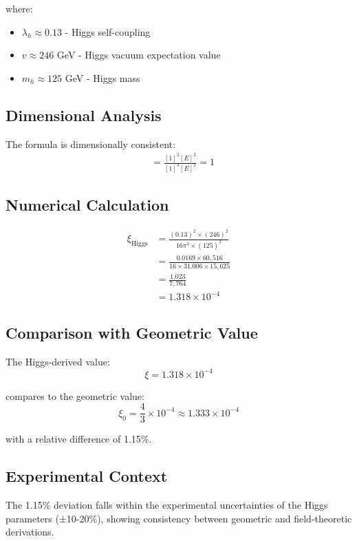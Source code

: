 \documentclass[12pt,a4paper]{article}
\theoremstyle{definition}
\begin{document}
	where:
	\begin{itemize}
		\item $\lambda_h \approx 0.13$ - Higgs self-coupling
		\item $v \approx 246$ GeV - Higgs vacuum expectation value  
		\item $m_h \approx 125$ GeV - Higgs mass
	\end{itemize}
	
	\subsection{Dimensional Analysis}
	The formula is dimensionally consistent:
	{\footnotesize
		\begin{align*}
			[\xi] &= \frac{[1]^2[E]^2}{[1]^3[E]^2} = 1
		\end{align*}
	}
	
	\subsection{Numerical Calculation}
	
	\begin{align}
		\xi_{\text{Higgs}} &= \frac{(0.13)^2 \times (246)^2}{16\pi^3 \times (125)^2}\\
		&= \frac{0.0169 \times 60{,}516}{16 \times 31.006 \times 15{,}625}\\
		&= \frac{1.023}{7{,}764}\\
		&= 1.318 \times 10^{-4}
	\end{align}
	
	\subsection{Comparison with Geometric Value}
	The Higgs-derived value:
	\begin{equation}
		\xi = 1.318 \times 10^{-4}
	\end{equation}
	
	compares to the geometric value:
	\begin{equation}
		\xi_0 = \frac{4}{3} \times 10^{-4} \approx 1.333 \times 10^{-4}
	\end{equation}
	
	with a relative difference of 1.15\%.
	
	\subsection{Experimental Context}
	The 1.15\% deviation falls within the experimental uncertainties of the Higgs parameters (±10-20\%), showing consistency between geometric and field-theoretic derivations.
	
\end{document}
